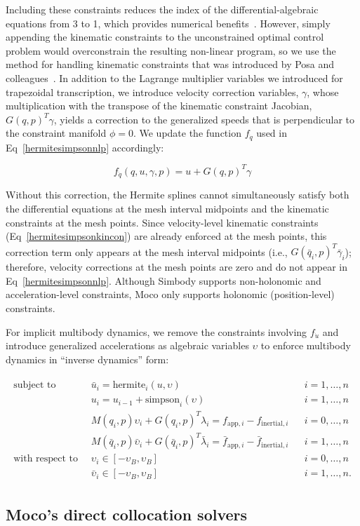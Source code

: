 \documentclass[10pt,letterpaper]{article}
\newcommand{\hermitesimpsonimplicit}{
\begin{align}
    \begin{aligned}
    \mbox{subject to} \quad
         & \bar{u}_i = \textrm{hermite}_i(u, \upsilon) && i = 1, \ldots, n \\
         & u_i = u_{i-1} + \textrm{simpson}_i(\upsilon)  && i = 1, \ldots, n \\
         & M(q_i, p)\upsilon_i + G(q_i, p)^T \lambda_i =
          f_{\textrm{app},i} -
            f_{\textrm{inertial},i} && i = 0, \ldots, n \\
         & M(\bar{q}_i, p)\bar{\upsilon}_i + G(\bar{q}_i, p)^T \bar{\lambda}_i =
          \bar{f}_{\textrm{app},i} -
            \bar{f}_{\textrm{inertial},i} && i = 1, \ldots, n \\
    \mbox{with respect to} \quad
         & \upsilon_i \in [-\upsilon_{B}, \upsilon_{B}] && i = 0, \ldots, n \\
         & \bar{\upsilon}_i \in [-\upsilon_{B}, \upsilon_{B}] && i = 1, \ldots, n.
    \end{aligned}
\end{align}
}
\begin{document}
Including these constraints reduces the index of the differential-algebraic equations from 3 to 1, which provides numerical benefits~\cite{Hairer:1996,Campbell:2016,Betts:2010}. However, simply appending the kinematic constraints to the unconstrained optimal control problem would overconstrain the resulting non-linear program, so we use the method for handling kinematic constraints that was introduced by Posa and colleagues~\cite{Posa:2016}. In addition to the Lagrange multiplier variables we introduced for trapezoidal transcription, we introduce velocity correction variables, $\gamma$, whose multiplication with the transpose of the kinematic constraint Jacobian, $G(q, p)^T \gamma$, yields a correction to the generalized speeds that is perpendicular to the constraint manifold $\phi = 0$. We update the function $f_{\dot{q}}$ used in Eq~\ref{hermitesimpsonnlp} accordingly:

\begin{equation}
f_{\dot{q}}(q, u, \gamma, p) = u + G(q, p)^T \gamma
\end{equation}

Without this correction, the Hermite splines cannot simultaneously satisfy both the differential equations at the mesh interval midpoints and the kinematic constraints at the mesh points. Since velocity-level kinematic constraints (Eq~\ref{hermitesimpsonkincon}) are already enforced at the mesh points, this correction term only appears at the mesh interval midpoints (i.e., $G(\bar{q}_i, p)^T \bar{\gamma}_i$); therefore, velocity corrections at the mesh points are zero and do not appear in Eq~\ref{hermitesimpsonnlp}. Although Simbody supports non-holonomic and acceleration-level constraints, Moco only supports holonomic (position-level) constraints.

For implicit multibody dynamics, we remove the constraints involving $f_{\dot{u}}$ and introduce generalized accelerations as algebraic variables $\upsilon$ to enforce multibody dynamics in “inverse dynamics” form:

\hermitesimpsonimplicit

\subsection*{Moco's direct collocation solvers}
\end{document}
